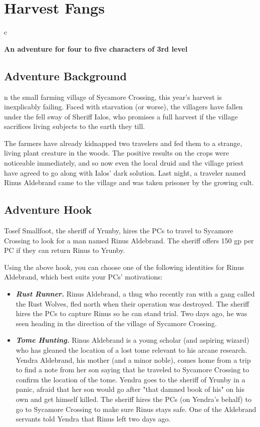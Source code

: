 \documentclass[10pt,a4paper,twoside,bg=print,twocolumn,openany,nodeprecatedcode]{dndbook}
\begin{document}
\chapter{Harvest Fangs}

\begin{DndTable}{c}

\textbf{An adventure for four to five characters of 3rd level}\\
\end{DndTable}

\section{Adventure Background}
n the small farming village of Sycamore Crossing, this year's harvest is inexplicably failing. Faced with starvation (or worse), the villagers have fallen under the fell sway of Sheriff Ialos, who promises a full harvest if the village sacrifices living subjects to the earth they till.


The farmers have already kidnapped two travelers and fed them to a strange, living plant creature in the woods. The positive results on the crops were noticeable immediately, and so now even the local druid and the village priest have agreed to go along with Ialos' dark solution. Last night, a traveler named Rinus Aldebrand came to the village and was taken prisoner by the growing cult.

\section{Adventure Hook}
Tosef Smallfoot, the sheriff of Yrunby, hires the PCs to travel to Sycamore Crossing to look for a man named Rinus Aldebrand. The sheriff offers 150 gp per PC if they can return Rinus to Yrunby.

Using the above hook, you can choose one of the following identities for Rinus Aldebrand, which best suits your PCs' motivations:


\begin{itemize}
\item \textbf{\textit{Rust Runner.}} Rinus Aldebrand, a thug who recently ran with a gang called the Rust Wolves, fled north when their operation was destroyed. The sheriff hires the PCs to capture Rinus so he can stand trial. Two days ago, he was seen heading in the direction of the village of Sycamore Crossing.
\item \textbf{\textit{Tome Hunting.}} Rinus Aldebrand is a young scholar (and aspiring wizard) who has gleaned the location of a lost tome relevant to his arcane research. Yendra Aldebrand, his mother (and a minor noble), comes home from a trip to find a note from her son saying that he traveled to Sycamore Crossing to confirm the location of the tome. Yendra goes to the sheriff of Yrunby in a panic, afraid that her son would go after "that damned book of his" on his own and get himself killed. The sheriff hires the PCs (on Yendra's behalf) to go to Sycamore Crossing to make sure Rinus stays safe. One of the Aldebrand servants told Yendra that Rinus left two days ago.
\end{itemize}
\end{document}
